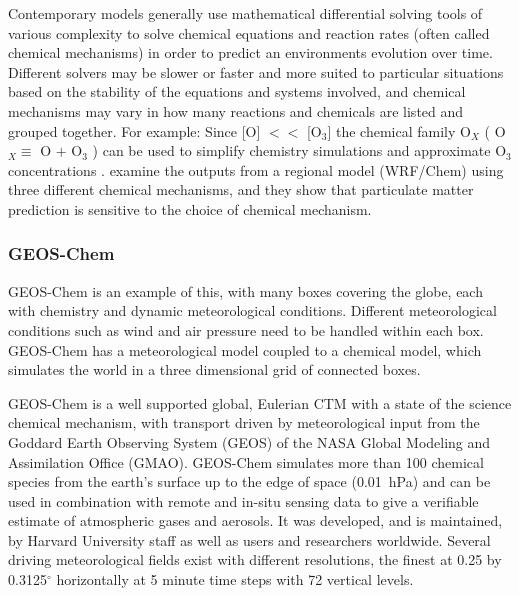   Contemporary models generally use mathematical differential solving tools of various complexity to solve chemical equations and reaction rates (often called chemical mechanisms) in order to predict an environments evolution over time.
  Different solvers may be slower or faster and more suited to particular situations based on the stability of the equations and systems involved, and chemical mechanisms may vary in how many reactions and chemicals are listed and grouped together.
  For example: Since [O] $<<$ [O$_3$] the chemical family O$_X$ (  O$_X \equiv $ O $+$ O$_3$ ) can be used to simplify chemistry simulations and approximate O$_3$ concentrations \citep[][Chapter 3]{BrasseurJacob2017}.
  \cite{Zhang2012} examine the outputs from a regional model (WRF/Chem) using three different chemical mechanisms, and they show that particulate matter prediction is sensitive to the choice of chemical mechanism. 
  
  \subsubsection{GEOS-Chem}
  GEOS-Chem is an example of this, with many boxes covering the globe, each with chemistry and dynamic meteorological conditions.
  Different meteorological conditions such as wind and air pressure need to be handled within each box.      
  GEOS-Chem has a meteorological model coupled to a chemical model, which simulates the world in a three dimensional grid of connected boxes.
  
  GEOS-Chem is a well supported global, Eulerian CTM with a state of the science chemical mechanism, with transport driven by meteorological input from the Goddard Earth Observing System (GEOS) of the NASA Global Modeling and Assimilation Office (GMAO).
  GEOS-Chem simulates more than 100 chemical species from the earth's surface up to the edge of space (0.01~hPa) and can be used in combination with remote and in-situ sensing data to give a verifiable estimate of atmospheric gases and aerosols.
  It was developed, and is maintained, by Harvard University staff as well as users and researchers worldwide.
  Several driving meteorological fields exist with different resolutions, the finest at 0.25 by 0.3125$^\circ$ horizontally at 5 minute time steps with 72 vertical levels.
  
